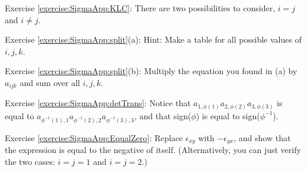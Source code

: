 \noindent Exercise \ref{exercise:SigmaApp:KLC}: There are two possibilities to consider, $i=j$ and $i \neq j$.

\noindent Exercise \ref{exercise:SigmaApp:split}(a): Hint: Make a table for all possible values of $i,j,k$.

\noindent Exercise \ref{exercise:SigmaApp:split}(b): Multiply the equation you found in (a) by $a_{ijk}$ and sum over all $i,j,k$.


\noindent Exercise \ref{exercise:SigmaApp:detTrans}: Notice that $a_{1, \phi(1)} a_{2, \phi(2)} a_{3, \phi(3)}$ is equal to $a_{\phi^{-1}(1), 1} a_{\phi^{-1}(2), 2} a_{\phi^{-1}(3), 3}$, and that sign($\phi$) is equal to sign($\phi^{-1}$). 

\noindent Exercise \ref{exercise:SigmaApp:EqualZero}: Replace $\epsilon_{xy}$ with $-\epsilon_{yx}$, and show that the expression is equal to the negative of itself. (Alternatively, you can just verify the two cases:  $i=j=1$ and $i=j=2$.)


